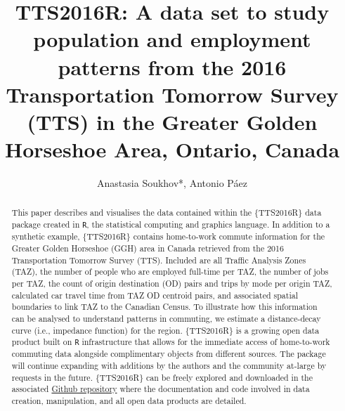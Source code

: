 \documentclass[Royal,times,sageh]{sagej}
\begin{document}

\title{TTS2016R: A data set to study population and employment patterns
from the 2016 Transportation Tomorrow Survey (TTS) in the Greater Golden
Horseshoe Area, Ontario, Canada}

\runninghead{}

\author{Anastasia Soukhov*, Antonio Páez}




\begin{abstract}
This paper describes and visualises the data contained within the
\{TTS2016R\} data package created in \texttt{R}, the statistical
computing and graphics language. In addition to a synthetic example,
\{TTS2016R\} contains home-to-work commute information for the Greater
Golden Horseshoe (GGH) area in Canada retrieved from the 2016
Transportation Tomorrow Survey (TTS). Included are all Traffic Analysis
Zones (TAZ), the number of people who are employed full-time per TAZ,
the number of jobs per TAZ, the count of origin destination (OD) pairs
and trips by mode per origin TAZ, calculated car travel time from TAZ OD
centroid pairs, and associated spatial boundaries to link TAZ to the
Canadian Census. To illustrate how this information can be analysed to
understand patterns in commuting, we estimate a distance-decay curve
(i.e., impedance function) for the region. \{TTS2016R\} is a growing
open data product built on \texttt{R} infrastructure that allows for the
immediate access of home-to-work commuting data alongside complimentary
objects from different sources. The package will continue expanding with
additions by the authors and the community at-large by requests in the
future. \{TTS2016R\} can be freely explored and downloaded in the
associated \href{https://github.com/soukhova/TTS2016R}{Github
repository} where the documentation and code involved in data creation,
manipulation, and all open data products are detailed.
\end{abstract}


\maketitle
\end{document}
